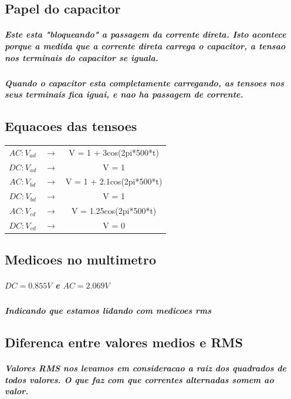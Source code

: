 \documentclass[12pt,twoside, a4paper, twocolumn]{article}
\begin{document}
\subsection{Papel do capacitor}

\subparagraph*{Este esta "bloqueando" a passagem da corrente direta. Isto acontece porque a medida que a corrente direta carrega o capacitor, a tensao nos terminais do capacitor se iguala. }
\subparagraph*{Quando o capacitor esta completamente carregando, as tensoes nos seus terminais fica iguai, e nao ha passagem de corrente.}

\subsection{Equacoes das tensoes}

\begin{center}
    \begin{tabular}{ |ccc| }
        \hline
        $AC: V_{ad}$ & $\rightarrow$ & V = 1 + 3cos(2pi*500*t)   \\
        $DC: V_{ad}$ & $\rightarrow$ & V = 1                     \\
        $AC: V_{bd}$ & $\rightarrow$ & V = 1 + 2.1cos(2pi*500*t) \\
        $DC: V_{bd}$ & $\rightarrow$ & V = 1                     \\
        $AC: V_{cd}$ & $\rightarrow$ & V = 1.25cos(2pi*500*t)    \\
        $DC: V_{cd}$ & $\rightarrow$ & V = 0                     \\
        \hline
    \end{tabular}
\end{center}




\subsection{Medicoes no multimetro}

\subparagraph*{$DC = 0.855V$ e $AC = 2.069V$}

\subparagraph*{Indicando que estamos lidando com medicoes rms}

\subsection{Diferenca entre valores medios e RMS}

\subparagraph*{Valores RMS nos levamos em consideracao a raiz dos quadrados de todos valores. O que faz com que correntes alternadas somem ao valor. }
\end{document}
